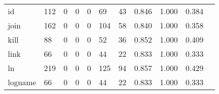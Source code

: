 \begin{longtable}{lp{1.2cm}p{1.2cm}p{1.2cm}p{1.2cm}p{1.2cm}p{1.2cm}p{1.2cm}p{1.2cm}p{1.2cm}p{1.2cm}}
id        &                                   112 &                                                  0 &                                                  0 &                                                  0 &                                                 69 &                                                 43 &                                              0.846 &                                              1.000 &                                              0.384 \\
join      &                                   162 &                                                  0 &                                                  0 &                                                  0 &                                                104 &                                                 58 &                                              0.840 &                                              1.000 &                                              0.358 \\
kill      &                                    88 &                                                  0 &                                                  0 &                                                  0 &                                                 52 &                                                 36 &                                              0.852 &                                              1.000 &                                              0.409 \\
link      &                                    66 &                                                  0 &                                                  0 &                                                  0 &                                                 44 &                                                 22 &                                              0.833 &                                              1.000 &                                              0.333 \\
ln        &                                   219 &                                                  0 &                                                  0 &                                                  0 &                                                125 &                                                 94 &                                              0.857 &                                              1.000 &                                              0.429 \\
logname   &                                    66 &                                                  0 &                                                  0 &                                                  0 &                                                 44 &                                                 22 &                                              0.833 &                                              1.000 &                                              0.333 \\

\end{longtable}
